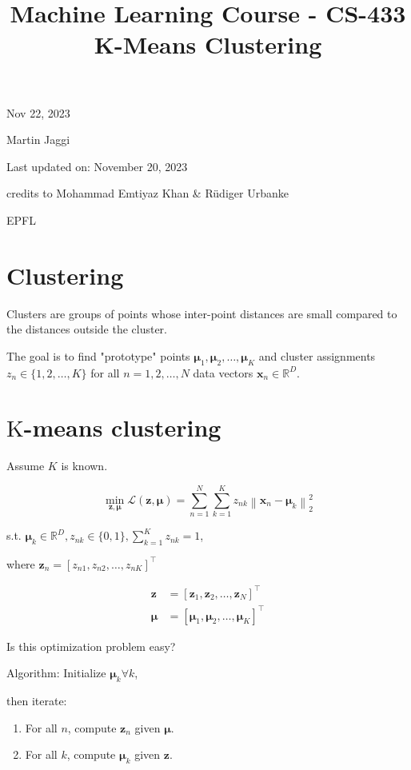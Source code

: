 \documentclass[10pt]{article}
\title{Machine Learning Course - CS-433 
 K-Means Clustering }
\author{}
\date{}
\begin{document}
\maketitle
Nov 22, 2023

Martin Jaggi

Last updated on: November 20, 2023

credits to Mohammad Emtiyaz Khan \& Rüdiger Urbanke

EPFL

\section*{Clustering}
Clusters are groups of points whose inter-point distances are small compared to the distances outside the cluster.

The goal is to find "prototype" points $\boldsymbol{\mu}_{1}, \boldsymbol{\mu}_{2}, \ldots, \boldsymbol{\mu}_{K}$ and cluster assignments $z_{n} \in\{1,2, \ldots, K\}$ for all $n=1,2, \ldots, N$ data vectors $\mathbf{x}_{n} \in \mathbb{R}^{D}$.

\section*{$\mathrm{K}$-means clustering}
Assume $K$ is known.

$$
\min _{\mathbf{z}, \boldsymbol{\mu}} \mathcal{L}(\mathbf{z}, \boldsymbol{\mu})=\sum_{n=1}^{N} \sum_{k=1}^{K} z_{n k}\left\|\mathbf{x}_{n}-\boldsymbol{\mu}_{k}\right\|_{2}^{2}
$$

s.t. $\boldsymbol{\mu}_{k} \in \mathbb{R}^{D}, z_{n k} \in\{0,1\}, \sum_{k=1}^{K} z_{n k}=1$,

where $\mathbf{z}_{n}=\left[z_{n 1}, z_{n 2}, \ldots, z_{n K}\right]^{\top}$

$$
\begin{aligned}
\mathbf{z} & =\left[\mathbf{z}_{1}, \mathbf{z}_{2}, \ldots, \mathbf{z}_{N}\right]^{\top} \\
\boldsymbol{\mu} & =\left[\boldsymbol{\mu}_{1}, \boldsymbol{\mu}_{2}, \ldots, \boldsymbol{\mu}_{K}\right]^{\top}
\end{aligned}
$$

Is this optimization problem easy?

Algorithm: Initialize $\boldsymbol{\mu}_{k} \forall k$,

then iterate:

\begin{enumerate}
  \item For all $n$, compute $\mathbf{z}_{n}$ given $\boldsymbol{\mu}$.

  \item For all $k$, compute $\boldsymbol{\mu}_{k}$ given $\mathbf{z}$.

\end{enumerate}
\end{document}
